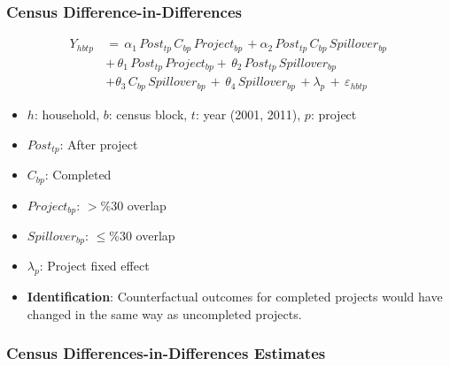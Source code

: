 \documentclass[aspectratio=149]{beamer}
\begin{document}



\begin{frame}
\frametitle{Census Difference-in-Differences}
\begin{align*}
Y_{hbtp} \, &= \, \alpha_{1} \, Post_{tp}\,  C_{bp}\,  Project_{bp} \, + \alpha_{2} \, Post_{tp} \, C_{bp} \, Spillover_{bp} \,   \\
&+ \,\theta_1\,  Post_{tp} \, Project_{bp} + \,\theta_2 \, Post_{tp} \, Spillover_{bp}  \,  \\
& + \theta_3\,  C_{bp} \, Spillover_{bp} \, +  \, \theta_4 \, Spillover_{bp} \, +  \lambda_p \, + \, \varepsilon_{hbtp}
\end{align*}

\begin{itemize}
\item $h$: household, $b$: census block, $t$: year (2001, 2011), $p$: project
\item $Post_{tp}$: After project
\item $C_{bp}$: Completed
\item $Project_{bp}$: $>$\%30 overlap
\item $Spillover_{bp}$: $\leq$\%30 overlap
\item $\lambda_p$: Project fixed effect
\end{itemize}

\begin{itemize}
  \item \textbf{Identification}: Counterfactual outcomes for completed projects would have changed in the same way as uncompleted projects.
\end{itemize}


\end{frame}






\begin{frame}
\frametitle{Census Differences-in-Differences Estimates}

\resizebox{\textwidth}{!}{  

}

\end{frame}
\end{document}
